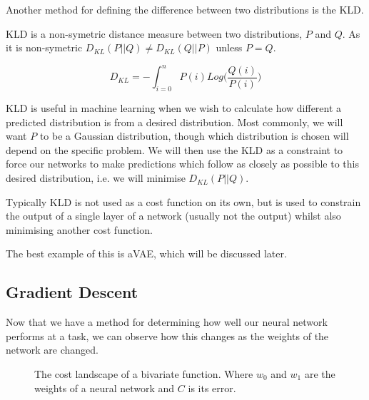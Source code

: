 Another method for defining the difference between two distributions is the \ac{KLD}.

\ac{KLD} is a non-symetric distance measure between two distributions, $P$ and $Q$. As it is non-symetric $D_{KL}(P||Q) \neq D_{KL}(Q||P)$ unless $P = Q$.

\begin{equation} \label{eqn:kld}
D_{KL} = -\int_{i=0}^{n}{P(i)Log(\frac{Q(i)}{P(i)}})
\end{equation}

\ac{KLD} is useful in machine learning when we wish to calculate how different a predicted distribution is from a desired distribution. Most commonly, we will want $P$ to be a Gaussian distribution, though which distribution is chosen will depend on the specific problem. We will then use the \ac{KLD} as a constraint to force our networks to make predictions which follow as closely as possible to this desired distribution, i.e. we will minimise $D_{KL}(P||Q)$.

Typically \ac{KLD} is not used as a cost function on its own, but is used to constrain the output of a single layer of a network (usually not the output) whilst also minimising another cost function.

The best example of this is a\ac{VAE}, which will be discussed later.


\subsection{Gradient Descent}
Now that we have a method for determining how well our neural network performs at a task, we can observe how this changes as the weights of the network are changed.


\begin{figure}
\begin{center}
\caption{The cost landscape of a bivariate function. Where $w_0$ and $w_1$ are the weights of a neural network and $C$ is its error.}
\label{fig:costscape}
\end{center}
\end{figure}

